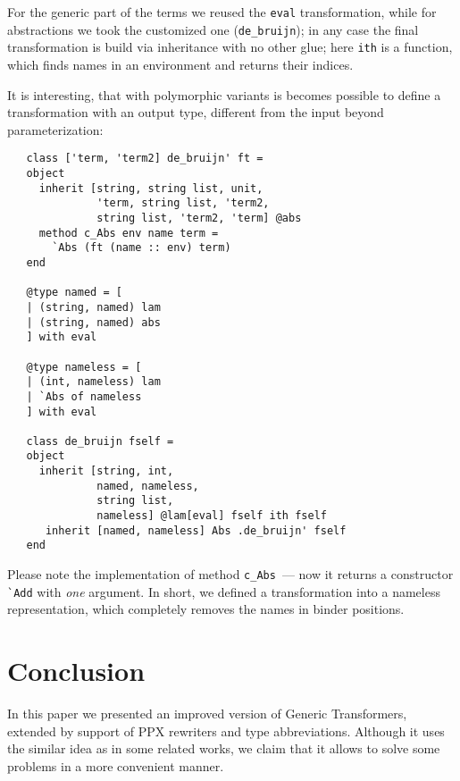 \documentclass[submission,copyright,creativecommons]{eptcs}
\newcommand{\cd}[1]{\texttt{#1}}
\begin{document}
For the generic part of the terms we reused the \cd{eval} transformation, while for abstractions we took the customized one (\lstinline{de_bruijn}); in
any case the final transformation is build via inheritance with no other glue; here \lstinline{ith} is a function, which finds names in an
environment and returns their indices.

It is interesting, that with polymorphic variants is becomes possible to define a transformation with an output type, different from the input
beyond parameterization:

\begin{lstlisting}
   class ['term, 'term2] de_bruijn' ft =
   object
     inherit [string, string list, unit,
              'term, string list, 'term2,
              string list, 'term2, 'term] @abs
     method c_Abs env name term =
       `Abs (ft (name :: env) term) 
   end
     
   @type named = [
   | (string, named) lam
   | (string, named) abs
   ] with eval
                     
   @type nameless = [
   | (int, nameless) lam
   | `Abs of nameless
   ] with eval

   class de_bruijn fself =
   object
     inherit [string, int,
              named, nameless,
              string list,
              nameless] @lam[eval] fself ith fself
      inherit [named, nameless] Abs .de_bruijn' fself 
   end
\end{lstlisting}

Please note the implementation of method \lstinline{c_Abs}~--- now it returns a constructor \lstinline{`Add} with \emph{one}
argument. In short, we defined a transformation into a nameless representation, which completely removes the names in binder
positions.



\section{Conclusion}
In this paper we presented an improved version of Generic Transformers, extended by support of PPX rewriters and type abbreviations. Although it 
uses the similar idea as in some related works, we claim that it allows to solve some problems in a more convenient manner.


\nocite{*}


\end{document}
